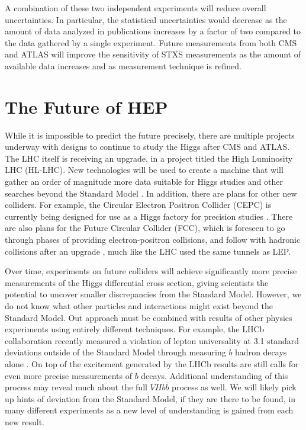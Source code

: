 A combination of these two independent experiments will reduce overall uncertainties.
In particular, the statistical uncertainties would decrease as the amount of data analyzed in publications
increases by a factor of two compared to the data gathered by a single experiment.
Future measurements from both CMS and ATLAS will improve the sensitivity of STXS measurements
as the amount of available data increases and as measurement technique is refined.

\section{The Future of HEP}

While it is impossible to predict the future precisely,
there are multiple projects underway with designs to continue to study the Higgs after CMS and ATLAS.
The LHC itself is receiving an upgrade, in a project titled the High Luminosity LHC (HL-LHC).
New technologies will be used to create a machine that will gather
an order of magnitude more data suitable for Higgs studies and
other searches beyond the Standard Model \cite{osti_1365580}.
In addition, there are plans for other new colliders.
For example, the Circular Electron Positron Collider (CEPC) is currently being designed
for use as a Higgs factory for precision studies \cite{thecepcstudygroup2018cepc}.
There are also plans for the Future Circular Collider (FCC),
which is foreseen to go through phases of providing electron-positron collisions,
and follow with hadronic collisions after an upgrade \cite{benedikt2020future},
much like the LHC used the same tunnels as LEP.

Over time, experiments on future colliders will achieve significantly more precise measurements
of the Higgs differential cross section,
giving scientists the potential to uncover smaller discrepancies from the Standard Model.
However, we do not know what other particles and interactions might exist beyond the Standard Model.
Out approach must be combined with results of other physics experiments using entirely different techniques.
For example, the LHCb collaboration recently measured a violation of lepton universality
at 3.1 standard deviations outside of the Standard Model through measuring $b$ hadron decays alone
\cite{lhcbcollaboration2021test}.
On top of the excitement generated by the LHCb results are still calls for
even more precise measurements of $b$ decays.
Additional understanding of this process may reveal much about the full $V\!Hb\bar{b}$ process as well.
We will likely pick up hints of deviation from the Standard Model, if they are there to be found,
in many different experiments as a new level of understanding is gained from each new result.
